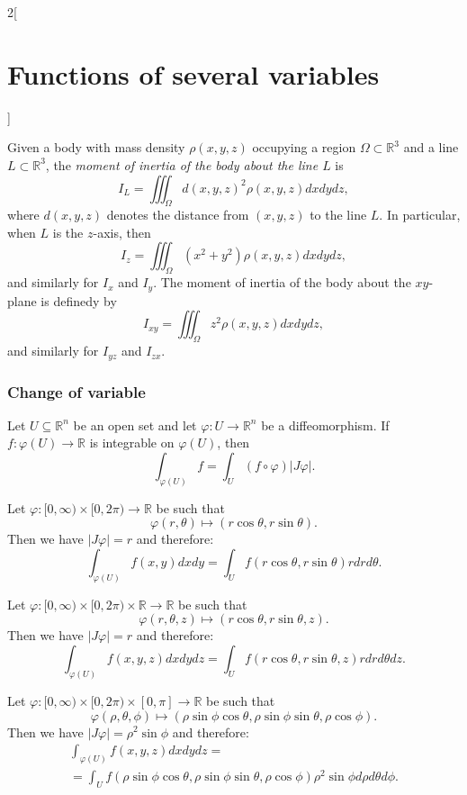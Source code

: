 \documentclass[../../../main.tex]{subfiles}
\begin{document}
\begin{multicols}{2}[\section{Functions of several variables}]
\begin{definition}
Given a body with mass density $\rho(x,y,z)$ occupying a region $\Omega\subset\mathbb{R}^3$ and a line $L\subset\mathbb{R}^3$, the \textit{moment of inertia of the body about the line $L$} is $$I_L=\iiint_\Omega d(x,y,z)^2\rho(x,y,z)dxdydz,$$ where $d(x,y,z)$ denotes the distance from $(x,y,z)$ to the line $L$. In particular, when $L$ is the $z$-axis, then $$I_z=\iiint_\Omega (x^2+y^2)\rho(x,y,z)dxdydz,$$ and similarly for $I_x$ and $I_y$. The moment of inertia of the body about the $xy$-plane is definedy by $$I_{xy}=\iiint_\Omega z^2\rho(x,y,z)dxdydz,$$ and similarly for $I_{yz}$ and $I_{zx}.$
\end{definition}
\subsubsection*{Change of variable}
\begin{theorem}
Let $U\subseteq\mathbb{R}^n$ be an open set and let $\varphi:U\rightarrow\mathbb{R}^n$ be a diffeomorphism. If $f:\varphi(U)\rightarrow\mathbb{R}$ is integrable on $\varphi(U)$, then $$\int_{\varphi(U)} f=\int_U(f\circ\varphi)|J\varphi|.$$
\end{theorem}
\begin{corollary}
Let $\varphi:[0,\infty)\times[0,2\pi)\rightarrow\mathbb{R}$ be such that
$$\varphi(r,\theta)\longmapsto(r\cos\theta,r\sin\theta).$$
Then we have $|J\varphi|=r$ and therefore: $$\int_{\varphi(U)}f(x,y)dxdy=\int_Uf(r\cos\theta,r\sin\theta)rdrd\theta.$$
\end{corollary}
\begin{corollary}
Let $\varphi:[0,\infty)\times[0,2\pi)\times\mathbb{R}\rightarrow\mathbb{R}$ be such that $$\varphi(r,\theta,z)\longmapsto(r\cos\theta,r\sin\theta,z).$$
Then we have $|J\varphi|=r$ and therefore: $$\int_{\varphi(U)}f(x,y,z)dxdydz=\int_Uf(r\cos\theta,r\sin\theta,z)rdrd\theta dz.$$
\end{corollary}
\begin{corollary}
Let $\varphi:[0,\infty)\times[0,2\pi)\times[0,\pi]\rightarrow\mathbb{R}$ be such that $$\varphi(\rho,\theta,\phi)\longmapsto(\rho\sin\phi\cos\theta,\rho\sin\phi\sin\theta,\rho\cos\phi).$$
Then we have $|J\varphi|=\rho^2\sin\phi$ and therefore:
\begin{multline*}
    \int_{\varphi(U)}f(x,y,z)dxdydz=\\=\int_Uf(\rho\sin\phi\cos\theta,\rho\sin\phi\sin\theta,\rho\cos\phi)\rho^2\sin\phi d\rho d\theta d\phi.
\end{multline*}
\end{corollary}

\end{multicols}
\end{document}
